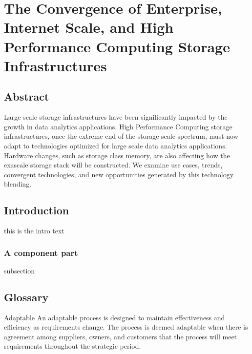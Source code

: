 

\chapter{The Convergence of Enterprise, Internet Scale, and High Performance Computing Storage Infrastructures}

\section*{Abstract}
Large scale storage infrastructures have been significantly impacted by the
growth in data analytics applications. High Performance Computing storage
infrastructures, once the extreme end of the storage scale spectrum, must now
adapt to technologies optimized for large scale data analytics applications.
Hardware changes, such as storage class memory, are also affecting how
the exascale storage stack will be constructed. We examine use cases, trends,
convergent technologies, and new opportunities generated by this technology
blending.

\section{Introduction}\label{sec:intro}
this is the intro text


\subsection{A component part}
subsection~\cite{ilyas2004hsn}



\section{Glossary}
\begin{Glossary}
\item[Adaptable] An adaptable process is designed to maintain effectiveness and
efficiency as requirements change. The process is deemed adaptable when there
is agreement among suppliers, owners, and customers that the process will meet
requirements throughout the strategic period.
\end{Glossary}

